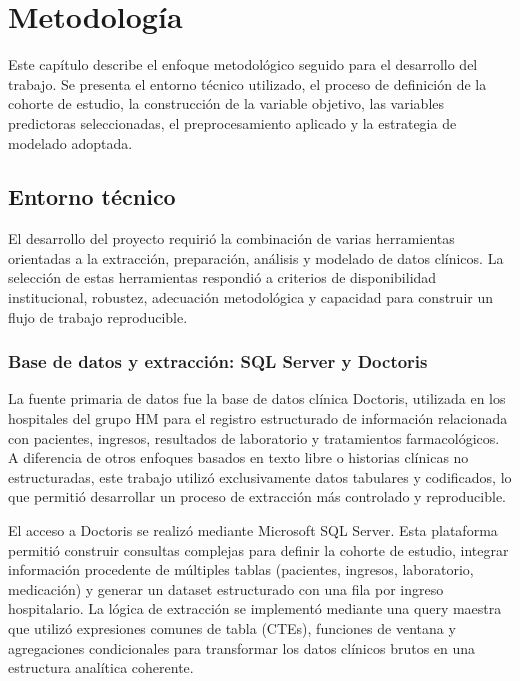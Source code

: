 \documentclass[12pt, a4paper, oneside]{report}
\begin{document}
\chapter{Metodología}
\label{chap:metodologia}

Este capítulo describe el enfoque metodológico seguido para el desarrollo del trabajo. Se presenta el entorno técnico utilizado, el proceso de definición de la cohorte de estudio, la construcción de la variable objetivo, las variables predictoras seleccionadas, el preprocesamiento aplicado y la estrategia de modelado adoptada.

\section{Entorno técnico}

El desarrollo del proyecto requirió la combinación de varias herramientas orientadas a la extracción, preparación, análisis y modelado de datos clínicos. La selección de estas herramientas respondió a criterios de disponibilidad institucional, robustez, adecuación metodológica y capacidad para construir un flujo de trabajo reproducible.

\subsection{Base de datos y extracción: SQL Server y Doctoris}

La fuente primaria de datos fue la base de datos clínica Doctoris, utilizada en los hospitales del grupo HM para el registro estructurado de información relacionada con pacientes, ingresos, resultados de laboratorio y tratamientos farmacológicos. A diferencia de otros enfoques basados en texto libre o historias clínicas no estructuradas, este trabajo utilizó exclusivamente datos tabulares y codificados, lo que permitió desarrollar un proceso de extracción más controlado y reproducible.

El acceso a Doctoris se realizó mediante Microsoft SQL Server. Esta plataforma permitió construir consultas complejas para definir la cohorte de estudio, integrar información procedente de múltiples tablas (pacientes, ingresos, laboratorio, medicación) y generar un dataset estructurado con una fila por ingreso hospitalario. La lógica de extracción se implementó mediante una query maestra que utilizó expresiones comunes de tabla (CTEs), funciones de ventana y agregaciones condicionales para transformar los datos clínicos brutos en una estructura analítica coherente.
\end{document}
